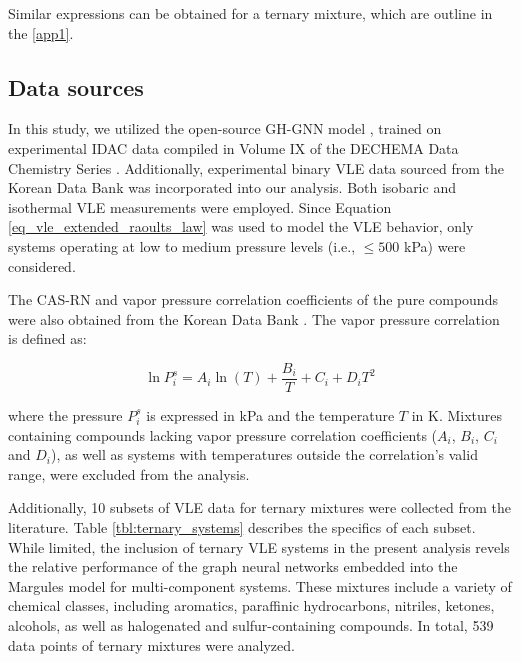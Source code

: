 Similar expressions can be obtained for a ternary mixture, which are outline in the \ref{app1}.

\subsection{Data sources}

In this study, we utilized the open-source GH-GNN model \cite{medina2023gibbs}, trained on experimental IDAC data compiled in Volume IX of the DECHEMA Data Chemistry Series \cite{dechema}. Additionally, experimental binary VLE data sourced from the Korean Data Bank \cite{koreandatabank} was incorporated into our analysis. Both isobaric and isothermal VLE measurements were employed. Since Equation \ref{eq_vle_extended_raoults_law} was used to model the VLE behavior, only systems operating at low to medium pressure levels (i.e., $\leq 500$ kPa) were considered.

The CAS-RN and vapor pressure correlation coefficients of the pure compounds were also obtained from the Korean Data Bank \cite{koreandatabank}. The vapor pressure correlation is defined as:

\begin{equation}
    \ln{P_i^s} = A_i \ln{(T)} + \frac{B_i}{T} + C_i + D_i T^2
    \label{eq_vapor_pressure_kdb}
\end{equation}

\noindent where the pressure $P_i^s$ is expressed in kPa and the temperature $T$ in K. Mixtures containing compounds lacking vapor pressure correlation coefficients ($A_i$, $B_i$, $C_i$ and $D_i$), as well as systems with temperatures outside the correlation’s valid range, were excluded from the analysis.

Additionally, 10 subsets of VLE data for ternary mixtures were collected from the literature. Table \ref{tbl:ternary_systems} describes the specifics of each subset. While limited, the inclusion of ternary VLE systems in the present analysis revels the relative performance of the graph neural networks embedded into the Margules model for multi-component systems. These mixtures include a variety of chemical classes, including aromatics, paraffinic hydrocarbons, nitriles, ketones, alcohols, as well as halogenated and sulfur-containing compounds. In total, 539 data points of ternary mixtures were analyzed.


